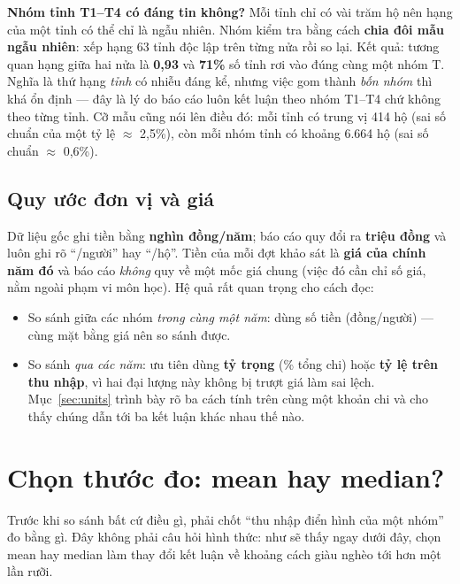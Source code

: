 \documentclass[11pt,a4paper]{article}
\newcommand{\n}[1]{\textbf{#1}}
\begin{document}
\begin{pp}
\textbf{Nhóm tỉnh T1–T4 có đáng tin không?} Mỗi tỉnh chỉ có vài trăm hộ nên hạng của một tỉnh có thể chỉ là ngẫu nhiên. Nhóm kiểm tra bằng cách \n{chia đôi mẫu ngẫu nhiên}: xếp hạng 63 tỉnh độc lập trên từng nửa rồi so lại. Kết quả: tương quan hạng giữa hai nửa là \n{0,93} và \n{71\%} số tỉnh rơi vào đúng cùng một nhóm T. Nghĩa là thứ hạng \emph{tỉnh} có nhiễu đáng kể, nhưng việc gom thành \emph{bốn nhóm} thì khá ổn định — đây là lý do báo cáo luôn kết luận theo nhóm T1–T4 chứ không theo từng tỉnh. Cỡ mẫu cũng nói lên điều đó: mỗi tỉnh có trung vị 414 hộ (sai số chuẩn của một tỷ lệ $\approx$ 2,5\%), còn mỗi nhóm tỉnh có khoảng 6.664 hộ (sai số chuẩn $\approx$ 0,6\%).
\end{pp}

\subsection{Quy ước đơn vị và giá}\label{sec:unitconv}
Dữ liệu gốc ghi tiền bằng \n{nghìn đồng/năm}; báo cáo quy đổi ra \n{triệu đồng} và luôn ghi rõ “/người” hay “/hộ”. Tiền của mỗi đợt khảo sát là \n{giá của chính năm đó} và báo cáo \emph{không} quy về một mốc giá chung (việc đó cần chỉ số giá, nằm ngoài phạm vi môn học). Hệ quả rất quan trọng cho cách đọc:

\begin{itemize}[leftmargin=1.2em,itemsep=2pt,topsep=2pt]
\item So sánh giữa các nhóm \emph{trong cùng một năm}: dùng số tiền (đồng/người) — cùng mặt bằng giá nên so sánh được.
\item So sánh \emph{qua các năm}: ưu tiên dùng \n{tỷ trọng} (\% tổng chi) hoặc \n{tỷ lệ trên thu nhập}, vì hai đại lượng này không bị trượt giá làm sai lệch. Mục~\ref{sec:units} trình bày rõ ba cách tính trên cùng một khoản chi và cho thấy chúng dẫn tới ba kết luận khác nhau thế nào.
\end{itemize}

\section{Chọn thước đo: mean hay median?}\label{sec:measure}

Trước khi so sánh bất cứ điều gì, phải chốt “thu nhập điển hình của một nhóm” đo bằng gì. Đây không phải câu hỏi hình thức: như sẽ thấy ngay dưới đây, chọn mean hay median làm thay đổi kết luận về khoảng cách giàu nghèo tới hơn một lần rưỡi.
\end{document}
